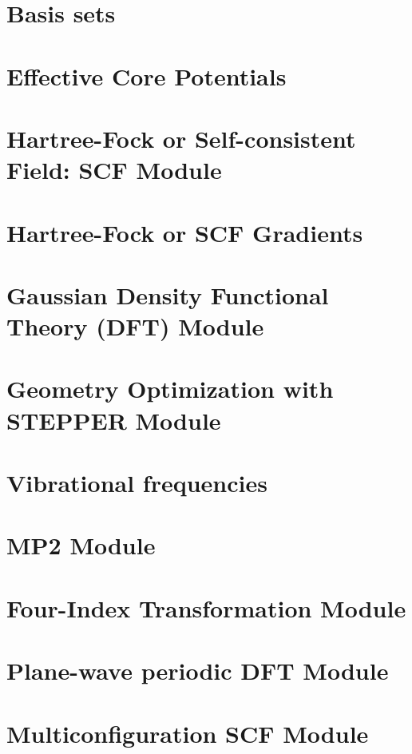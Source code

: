 \section{Basis sets}


\section{Effective Core Potentials}


\section{Hartree-Fock or Self-consistent Field: SCF Module} 


\section{Hartree-Fock or SCF Gradients}


\section{Gaussian Density Functional Theory (DFT) Module}


\section{Geometry Optimization with STEPPER Module}


\section{Vibrational frequencies}


\section{MP2 Module}


\section{Four-Index Transformation Module} 


\section{Plane-wave periodic DFT Module}


\section{Multiconfiguration SCF Module}


